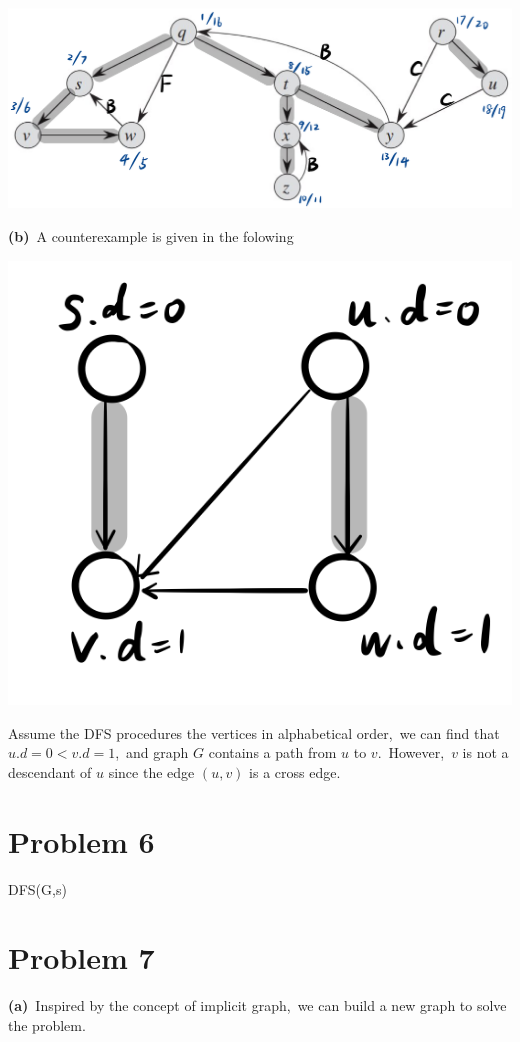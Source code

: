 \documentclass[]{article}
\begin{document}
	\includegraphics[width=.9\textwidth]{3.png} 
	
	\textbf{(b)}\ A counterexample is given in the folowing

    \includegraphics[width=.5\textwidth]{4.png}
    
    Assume the DFS procedures the vertices in alphabetical order,\ we can find that $u.d = 0 < v.d = 1$,\ and graph $G$ contains a path from $u$ to $v$.\ However,\ $v$ is not a descendant of $u$ since the edge $(u,v)$ is a cross edge.
	
	\section{Problem 6}
	\begin{algorithm}[H]
		\caption{DFS(G,s)} %
		\begin{algorithmic}[1]
			\Else
			\EndIf
			\Else
			\EndIf
			\EndFor
		\end{algorithmic}
	\end{algorithm}

	\section{Problem 7}
	\textbf{(a)}\ Inspired by the concept of implicit graph,\ we can build a new graph to solve the problem.
	
\end{document}

